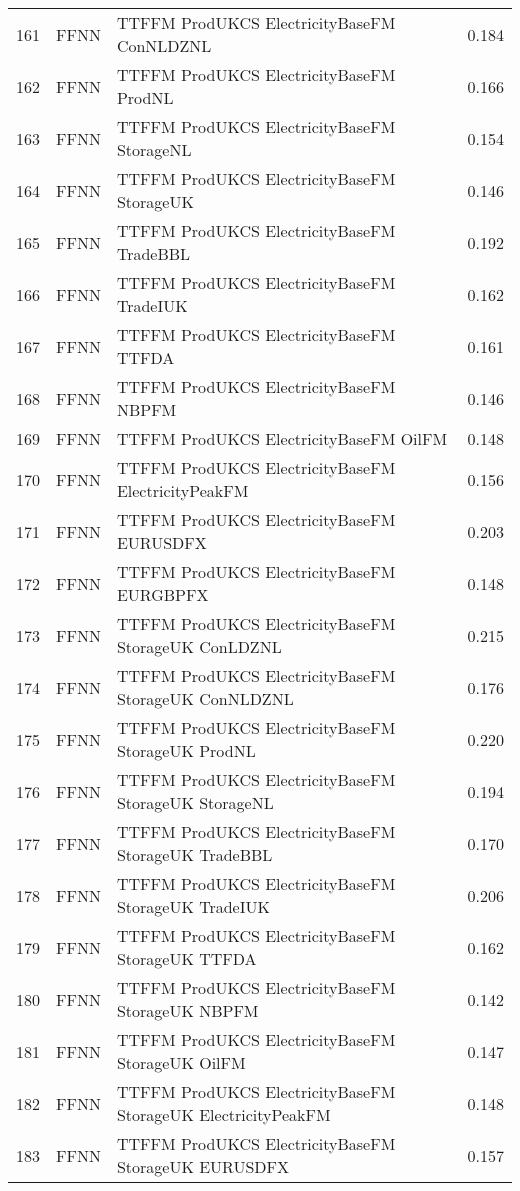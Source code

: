 \begin{table}[ht]
\begin{tabular}{rllr}
  161 & FFNN & TTFFM ProdUKCS ElectricityBaseFM ConNLDZNL & 0.184 \\ 
  162 & FFNN & TTFFM ProdUKCS ElectricityBaseFM ProdNL & 0.166 \\ 
  163 & FFNN & TTFFM ProdUKCS ElectricityBaseFM StorageNL & 0.154 \\ 
  164 & FFNN & TTFFM ProdUKCS ElectricityBaseFM StorageUK & 0.146 \\ 
  165 & FFNN & TTFFM ProdUKCS ElectricityBaseFM TradeBBL & 0.192 \\ 
  166 & FFNN & TTFFM ProdUKCS ElectricityBaseFM TradeIUK & 0.162 \\ 
  167 & FFNN & TTFFM ProdUKCS ElectricityBaseFM TTFDA & 0.161 \\ 
  168 & FFNN & TTFFM ProdUKCS ElectricityBaseFM NBPFM & 0.146 \\ 
  169 & FFNN & TTFFM ProdUKCS ElectricityBaseFM OilFM & 0.148 \\ 
  170 & FFNN & TTFFM ProdUKCS ElectricityBaseFM ElectricityPeakFM & 0.156 \\ 
  171 & FFNN & TTFFM ProdUKCS ElectricityBaseFM EURUSDFX & 0.203 \\ 
  172 & FFNN & TTFFM ProdUKCS ElectricityBaseFM EURGBPFX & 0.148 \\ 
  173 & FFNN & TTFFM ProdUKCS ElectricityBaseFM StorageUK ConLDZNL & 0.215 \\ 
  174 & FFNN & TTFFM ProdUKCS ElectricityBaseFM StorageUK ConNLDZNL & 0.176 \\ 
  175 & FFNN & TTFFM ProdUKCS ElectricityBaseFM StorageUK ProdNL & 0.220 \\ 
  176 & FFNN & TTFFM ProdUKCS ElectricityBaseFM StorageUK StorageNL & 0.194 \\ 
  177 & FFNN & TTFFM ProdUKCS ElectricityBaseFM StorageUK TradeBBL & 0.170 \\ 
  178 & FFNN & TTFFM ProdUKCS ElectricityBaseFM StorageUK TradeIUK & 0.206 \\ 
  179 & FFNN & TTFFM ProdUKCS ElectricityBaseFM StorageUK TTFDA & 0.162 \\ 
  180 & FFNN & TTFFM ProdUKCS ElectricityBaseFM StorageUK NBPFM & 0.142 \\ 
  181 & FFNN & TTFFM ProdUKCS ElectricityBaseFM StorageUK OilFM & 0.147 \\ 
  182 & FFNN & TTFFM ProdUKCS ElectricityBaseFM StorageUK ElectricityPeakFM & 0.148 \\ 
  183 & FFNN & TTFFM ProdUKCS ElectricityBaseFM StorageUK EURUSDFX & 0.157 \\ 

\end{tabular}
\end{table}
